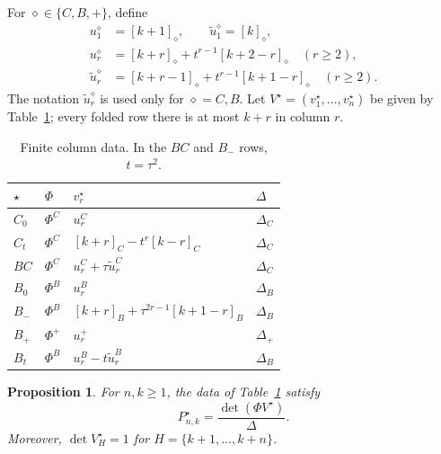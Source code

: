 \documentclass[12pt]{article}
\newtheorem{proposition}[theorem]{Proposition}
\numberwithin{equation}{section}
\begin{document}
For $\diamond\in\{C,B,+\}$, define
\[
\begin{aligned}
 u_1^\diamond&=[k+1]_\diamond,\qquad
 \widetilde u_1^\diamond=[k]_\diamond,\\
 u_r^\diamond&=[k+r]_\diamond+t^{r-1}[k+2-r]_\diamond
 \quad(r\ge2),\\
 \widetilde u_r^\diamond&=[k+r-1]_\diamond+t^{r-1}[k+1-r]_\diamond
 \quad(r\ge2).
\end{aligned}
\]
The notation $\widetilde u_r^\diamond$ is used only for $\diamond=C,B$.
Let $V^\star=(v_1^\star,\ldots,v_n^\star)$ be given by
Table~\ref{tab:finite-columns}; every folded row there is at most $k+r$
in column $r$.

\begin{table}[htbp]
\centering
\renewcommand{\arraystretch}{1.35}
\begin{tabular}{@{}llll@{}}
\toprule
$\star$ & $\Phi$ & $v_r^\star$ & $\Delta$\\
\midrule
$C_0$ & $\Phi^C$ & $u_r^C$ & $\Delta_C$\\
$C_t$ & $\Phi^C$ & $[k+r]_C-t^r[k-r]_C$ & $\Delta_C$\\
$BC$ & $\Phi^C$ & $u_r^C+\tau\widetilde u_r^C$ & $\Delta_C$\\
$B_0$ & $\Phi^B$ & $u_r^B$ & $\Delta_B$\\
$B_-$ & $\Phi^B$ & $[k+r]_B+\tau^{2r-1}[k+1-r]_B$ & $\Delta_B$\\
$B_+$ & $\Phi^+$ & $u_r^+$ & $\Delta_+$\\
$B_t$ & $\Phi^B$ & $u_r^B-t\widetilde u_r^B$ & $\Delta_B$\\
\bottomrule
\end{tabular}
\caption{Finite column data.  In the $BC$ and $B_-$ rows, $t=\tau^2$.}
\label{tab:finite-columns}
\end{table}

\begin{proposition}\label{prop:finite}
For $n,k\ge1$, the data of Table~\ref{tab:finite-columns} satisfy
\[
 P^\star_{n,k}=\frac{\det(\Phi V^\star)}{\Delta}.
\]
Moreover, $\det V^\star_H=1$ for $H=\{k+1,\ldots,k+n\}$.
\end{proposition}
\end{document}
